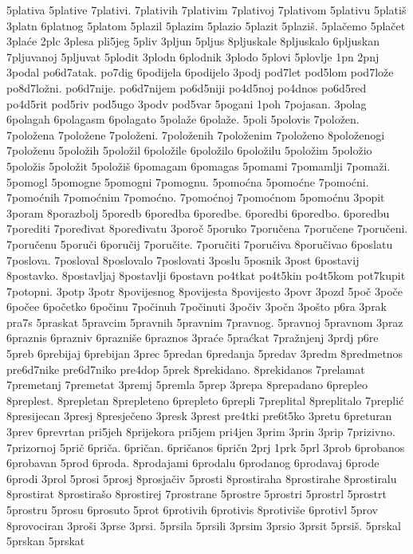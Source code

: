 {5plativa
5plative
7plativi.
7plativih
7plativim
7plativoj
7plativom
5plativu
5platiš
3platn
6platnog
5platom
5plazil
5plazim
5plazio
5plazit
5plaziš.
5plačemo
5plačet
3plaće
2plc
3plesa
pli5jeg
5pliv
3pljun
5pljus
8pljuskale
8pljuskalo
6pljuskan
7pljuvanoj
5pljuvat
5plodit
3plodn
6plodnik
3plodo
5plovi
5plovlje
1pn
2pnj
3podal
po6d7atak.
po7dig
6podijela
6podijelo
3podj
pod7let
pod5lom
pod7lože
po8d7ložni.
po6d7nije.
po6d7nijem
po6d5niji
po4d5noj
po4dnos
po6d5red
po4d5rit
pod5riv
pod5ugo
3podv
pod5var
5pogani
1poh
7pojasan.
3polag
6polagah
6polagasm
6polagato
5polaže
6polaže.
5poli
5polovis
7položen.
7položena
7položene
7položeni.
7položenih
7položenim
7položeno
8položenogi
7položenu
5položih
5položil
6položile
6položilo
6položilu
5položim
5položio
5položis
5položit
5položiš
6pomagam
6pomagas
5pomami
7pomamlji
7pomaži.
5pomogl
5pomogne
5pomogni
7pomognu.
5pomoćna
5pomoćne
7pomoćni.
7pomoćnih
7pomoćnim
7pomoćno.
7pomoćnoj
7pomoćnom
5pomoćnu
3popit
3poram
8porazbolj
5poredb
6poredba
6poredbe.
6poredbi
6poredbo.
6poredbu
7porediti
7poređivat
8poređivatu
3poroč
5poruko
7poručena
7poručene
7poručeni.
7poručenu
5poruči
6poručij
7poručite.
7poručiti
7poručiva
8poručivao
6poslatu
7poslova.
7posloval
8poslovalo
7poslovati
3poslu
5posnik
3post
6postavij
8postavko.
8postavljaj
8postavlji
6postavn
po4tkat
po4t5kin
po4t5kom
pot7kupit
7potopni.
3potp
3potr
8povijesnog
8povijesta
8povijesto
3povr
3pozd
5poč
3poče
6počee
6početko
6počinu
7počinuh
7počinuti
3počiv
3počn
3pošto
p6ra
3prak
pra7s
5praskat
5pravcim
5pravnih
5pravnim
7pravnog.
5pravnoj
5pravnom
3praz
6praznis
6prazniv
6prazniše
6praznos
3praće
5praćkat
7pražnjenj
3prdj
p6re
5preb
6prebijaj
6prebijan
3prec
5predan
6predanja
5predav
3predm
8predmetnos
pre6d7nike
pre6d7niko
pre4dop
5prek
8prekidano.
8prekidanos
7prelamat
7premetanj
7premetat
3premj
5premla
5prep
3prepa
8prepadano
6prepleo
8preplest.
8prepletan
8prepleteno
6prepleto
6prepli
7preplital
8preplitalo
7preplić
8presijecan
3presj
8presječeno
3presk
3prest
pre4tki
pre6t5ko
3pretu
6preturan
3prev
6prevrtan
pri5jeh
8prijekora
pri5jem
pri4jen
3prim
3prin
3prip
7prizivno.
7prizornoj
5prič
6priča.
6pričan.
6pričanos
6pričn
2prj
1prk
5prl
3prob
6probanos
6probavan
5prod
6proda.
8prodajami
6prodalu
6prodanog
6prodavaj
6prode
6prodi
3prol
5prosi
5prosj
8prosjačiv
5prosti
8prostiraha
8prostirahe
8prostiralu
8prostirat
8prostirašo
8prostirej
7prostrane
5prostre
5prostri
5prostrl
5prostrt
5prostru
5prosu
6prosuto
5prot
6protivih
6protivis
8protiviše
6protivl
5prov
8provociran
3proši
3prse
3prsi.
5prsila
5prsili
3prsim
3prsio
3prsit
5prsiš.
5prskal
5prskan
5prskat
}
